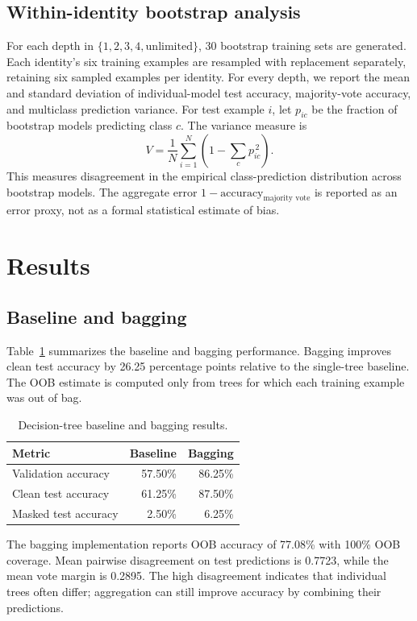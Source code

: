 \documentclass[10pt,twocolumn,letterpaper]{article}
\begin{document}
\subsection{Within-identity bootstrap analysis}
For each depth in $\{1,2,3,4,\text{unlimited}\}$, 30 bootstrap training sets are generated. Each identity's six training examples are resampled with replacement separately, retaining six sampled examples per identity. For every depth, we report the mean and standard deviation of individual-model test accuracy, majority-vote accuracy, and multiclass prediction variance. For test example $i$, let $p_{ic}$ be the fraction of bootstrap models predicting class $c$. The variance measure is
\[
V = \frac{1}{N}\sum_{i=1}^{N}\left(1-\sum_c p_{ic}^{\,2}\right).
\]
This measures disagreement in the empirical class-prediction distribution across bootstrap models. The aggregate error $1-\text{accuracy}_{\text{majority vote}}$ is reported as an error proxy, not as a formal statistical estimate of bias.

\section{Results}
\subsection{Baseline and bagging}
Table~\ref{tab:q1} summarizes the baseline and bagging performance. Bagging improves clean test accuracy by 26.25 percentage points relative to the single-tree baseline. The OOB estimate is computed only from trees for which each training example was out of bag.

\begin{table}[t]
\centering
\caption{Decision-tree baseline and bagging results.}
\label{tab:q1}
\begin{tabular}{lrr}
\toprule
Metric & Baseline & Bagging\\
\midrule
Validation accuracy & 57.50\% & 86.25\%\\
Clean test accuracy & 61.25\% & 87.50\%\\
Masked test accuracy & 2.50\% & 6.25\%\\
\bottomrule
\end{tabular}
\end{table}

The bagging implementation reports OOB accuracy of 77.08\% with 100\% OOB coverage. Mean pairwise disagreement on test predictions is 0.7723, while the mean vote margin is 0.2895. The high disagreement indicates that individual trees often differ; aggregation can still improve accuracy by combining their predictions.
\end{document}

